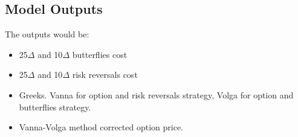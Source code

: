 \subsection{Model Outputs}
The outputs would be:
\begin{itemize}
	\item 25$\Delta$ and 10$\Delta$ butterflies cost
	\item 25$\Delta$ and 10$\Delta$ risk reversals cost
	\item Greeks. Vanna for option and risk reversals strategy, Volga for option and butterflies strategy.
	\item Vanna-Volga method corrected option price.
\end{itemize}